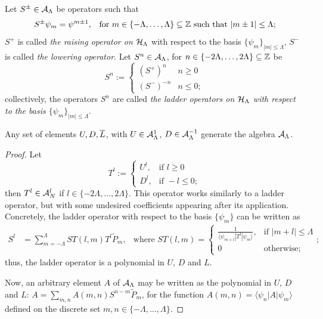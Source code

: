 \begin{definition}\label{definitionLadderOperatorsHLambda}
Let $S^\pm \in \mathcal A_{\Lambda}$ be operators such that
\begin{align}
    S^\pm \psi_m &= \psi^{m\pm 1}, & \text{for }m \in \{-\Lambda, \dots, \Lambda\} \subseteq \mathbb{Z} \text{ such that } |m \pm 1| \leq \Lambda;
\end{align}
$S^+$ is called \emph{the raising operator on $\mathcal H_\Lambda$} with respect to the basis $\{\psi_m\}_{|m| \leq \Lambda}$,  $S^-$ is called \emph{the lowering operator}. Let $S^n \in \mathcal A_\Lambda$, for $n \in \{-2\Lambda, \dots, 2\Lambda\} \subseteq \mathbb{Z}$ be
\begin{equation}
    S^n := \begin{cases}
    (S^+)^n & n \geq 0\\
    (S^-)^{-n} & n \leq 0;
    \end{cases}
\end{equation}
collectively, the operators $S^n$ are called \emph{the ladder operators on $\mathcal H_\Lambda$ with respect to the basis $\{\psi_m\}_{|m|\leq \Lambda}$}.
\end{definition}

\begin{lemma}\label{lemmaLUDScalarAngularMomentumGenerateD2}
Any set of elements ${U, D, \overline{L}}$, with $U \in \mathcal A^1_\Lambda$, $D \in \mathcal A^{-1}_\Lambda$ generate the algebra $\mathcal A_\Lambda$.
\end{lemma}
\begin{proof}
Let
\begin{equation*}
    T^l := 
    \begin{cases}
    U^l, &   \text{if } l \geq 0\\
    D^l, &   \text{if } -l \leq 0;
    \end{cases}
\end{equation*}
then $T^l \in \mathcal A_N^l$ if $l \in \{-2\Lambda, \dots, 2\Lambda\}$. This operator works similarly to a ladder operator, but with some undesired coefficients appearing after its application. Concretely, the ladder operator with respect to the basis $\{\psi_m\}$ can be written as
\begin{align}\label{equationFormulaGeneralLadderOperatorD2}
    S^l &= \sum_{m = -\Lambda}^\Lambda ST(l,m) T^l \tilde P_m, & \text{where }
    ST(l,m) =
        \begin{cases}
        \frac{1}{\langle \psi_{m+l}| T^l | \psi_{m}\rangle}, & \text{if } |m+l| \leq \Lambda\\
        0 & \text{otherwise;}
        \end{cases};
\end{align}
thus, the ladder operator is a polynomial in $U$, $D$ and $L$.

Now, an arbitrary element $A$ of $\mathcal A_\Lambda$ may be written as the polynomial in $U$, $D$ and $L$: $A =\sum_{m,n} A(m,n) S^{n-m} \tilde P_m$, for the function $A(m,n) = \langle \psi_n | A |\psi_m \rangle$ defined on the discrete set $m,n \in \{-\Lambda, \dots, \Lambda\}$.
\end{proof}

